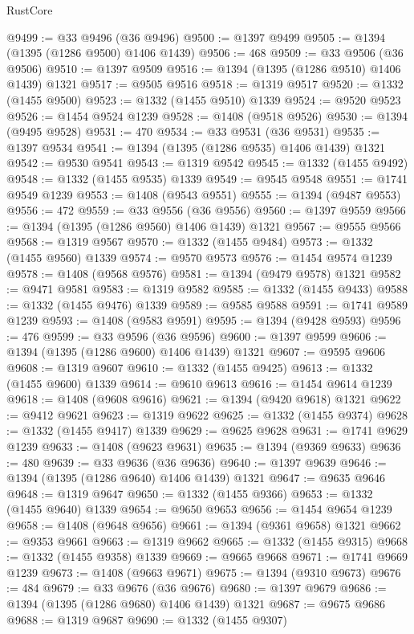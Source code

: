 \begin{lexlean}{RustCore}
\begin{coremodule}
@9499 := @33 @9496 (@36 @9496)
@9500 := @1397 @9499
@9505 := @1394 (@1395 (@1286 @9500) @1406 @1439)
@9506 := 468
@9509 := @33 @9506 (@36 @9506)
@9510 := @1397 @9509
@9516 := @1394 (@1395 (@1286 @9510) @1406 @1439) @1321
@9517 := @9505 @9516
@9518 := @1319 @9517
@9520 := @1332 (@1455 @9500)
@9523 := @1332 (@1455 @9510) @1339
@9524 := @9520 @9523
@9526 := @1454 @9524 @1239
@9528 := @1408 (@9518 @9526)
@9530 := @1394 (@9495 @9528)
@9531 := 470
@9534 := @33 @9531 (@36 @9531)
@9535 := @1397 @9534
@9541 := @1394 (@1395 (@1286 @9535) @1406 @1439) @1321
@9542 := @9530 @9541
@9543 := @1319 @9542
@9545 := @1332 (@1455 @9492)
@9548 := @1332 (@1455 @9535) @1339
@9549 := @9545 @9548
@9551 := @1741 @9549 @1239
@9553 := @1408 (@9543 @9551)
@9555 := @1394 (@9487 @9553)
@9556 := 472
@9559 := @33 @9556 (@36 @9556)
@9560 := @1397 @9559
@9566 := @1394 (@1395 (@1286 @9560) @1406 @1439) @1321
@9567 := @9555 @9566
@9568 := @1319 @9567
@9570 := @1332 (@1455 @9484)
@9573 := @1332 (@1455 @9560) @1339
@9574 := @9570 @9573
@9576 := @1454 @9574 @1239
@9578 := @1408 (@9568 @9576)
@9581 := @1394 (@9479 @9578) @1321
@9582 := @9471 @9581
@9583 := @1319 @9582
@9585 := @1332 (@1455 @9433)
@9588 := @1332 (@1455 @9476) @1339
@9589 := @9585 @9588
@9591 := @1741 @9589 @1239
@9593 := @1408 (@9583 @9591)
@9595 := @1394 (@9428 @9593)
@9596 := 476
@9599 := @33 @9596 (@36 @9596)
@9600 := @1397 @9599
@9606 := @1394 (@1395 (@1286 @9600) @1406 @1439) @1321
@9607 := @9595 @9606
@9608 := @1319 @9607
@9610 := @1332 (@1455 @9425)
@9613 := @1332 (@1455 @9600) @1339
@9614 := @9610 @9613
@9616 := @1454 @9614 @1239
@9618 := @1408 (@9608 @9616)
@9621 := @1394 (@9420 @9618) @1321
@9622 := @9412 @9621
@9623 := @1319 @9622
@9625 := @1332 (@1455 @9374)
@9628 := @1332 (@1455 @9417) @1339
@9629 := @9625 @9628
@9631 := @1741 @9629 @1239
@9633 := @1408 (@9623 @9631)
@9635 := @1394 (@9369 @9633)
@9636 := 480
@9639 := @33 @9636 (@36 @9636)
@9640 := @1397 @9639
@9646 := @1394 (@1395 (@1286 @9640) @1406 @1439) @1321
@9647 := @9635 @9646
@9648 := @1319 @9647
@9650 := @1332 (@1455 @9366)
@9653 := @1332 (@1455 @9640) @1339
@9654 := @9650 @9653
@9656 := @1454 @9654 @1239
@9658 := @1408 (@9648 @9656)
@9661 := @1394 (@9361 @9658) @1321
@9662 := @9353 @9661
@9663 := @1319 @9662
@9665 := @1332 (@1455 @9315)
@9668 := @1332 (@1455 @9358) @1339
@9669 := @9665 @9668
@9671 := @1741 @9669 @1239
@9673 := @1408 (@9663 @9671)
@9675 := @1394 (@9310 @9673)
@9676 := 484
@9679 := @33 @9676 (@36 @9676)
@9680 := @1397 @9679
@9686 := @1394 (@1395 (@1286 @9680) @1406 @1439) @1321
@9687 := @9675 @9686
@9688 := @1319 @9687
@9690 := @1332 (@1455 @9307)

\end{coremodule}
\end{lexlean}
